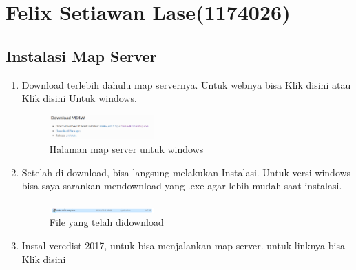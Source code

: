 \section{Felix Setiawan Lase(1174026)}
\subsection{Instalasi Map Server}
\begin{enumerate}
    \item Download terlebih dahulu map servernya. Untuk webnya bisa \href{https://mapserver.org/}{Klik disini} atau \href{https://ms4w.com/}{Klik disini} Untuk windows.
    \hfill\break
    \begin{figure}[H]
		\includegraphics[width=4cm]{figures/1174026/4/1.png}
		\centering
		\caption{Halaman map server untuk windows}
    \end{figure}
    \item Setelah di download, bisa langsung melakukan Instalasi. Untuk versi windows bisa saya sarankan mendownload yang .exe agar lebih mudah saat instalasi.
    \hfill\break
    \begin{figure}[H]
		\includegraphics[width=4cm]{figures/1174026/4/2.png}
		\centering
		\caption{File yang telah didownload}
    \end{figure}
    \item Instal vcredist 2017, untuk bisa menjalankan map server. untuk linknya bisa \href{https://support.microsoft.com/id-id/help/2977003/the-latest-supported-visual-c-downloads}{Klik disini}
\end{enumerate}
